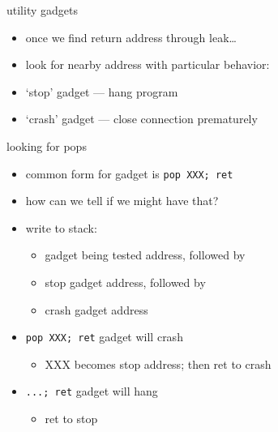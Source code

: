 \begin{frame}{utility gadgets}
    \begin{itemize}
    \item once we find return address through leak\ldots
    \item look for nearby address with particular behavior:
    \vspace{.5cm}
    \item `stop' gadget --- hang program
    \item `crash' gadget --- close connection prematurely
    \end{itemize}
\end{frame}

\begin{frame}{looking for pops}
    \begin{itemize}
    \item common form for gadget is \texttt{pop XXX; ret}
    \item how can we tell if we might have that?
    \item write to stack:   
        \begin{itemize}
        \item gadget being tested address, followed by
        \item stop gadget address, followed by
        \item crash gadget address
        \end{itemize}
    \item \texttt{pop XXX; ret} gadget will crash
        \begin{itemize}
        \item XXX becomes stop address; then ret to crash
        \end{itemize}
    \item \texttt{...; ret} gadget will hang
        \begin{itemize}
        \item ret to stop
        \end{itemize}
    \end{itemize}
\end{frame}

